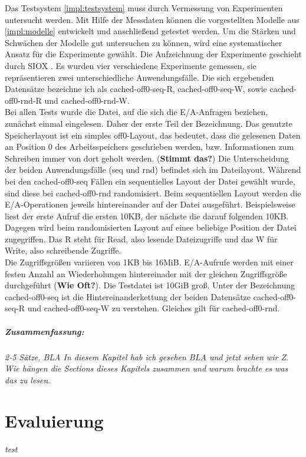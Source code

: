 \documentclass[
	12pt,
	a4paper,
	BCOR10mm,
	DIV14,
	listof=totoc,
	bibliography=totoc,
	headsepline
]{scrreprt}
\begin{document}
Das Testsystem \ref{impl:testsystem} muss durch Vermessung von Experimenten untersucht werden. Mit Hilfe der Messdaten können die vorgestellten Modelle aus \ref{impl:modelle} entwickelt und anschließend getestet werden. Um die Stärken und Schwächen der Modelle gut untersuchen zu können, wird eine systematischer Ansatz für die Experimente gewählt. Die Aufzeichnung der Experimente geschieht durch SIOX \cite{UMLTPTPONI15}. Es wurden vier verschiedene Experimente gemessen, sie repräsentieren zwei unterschiedliche Anwendungsfälle. Die sich ergebenden Datensätze bezeichne ich als cached-off0-seq-R, cached-off0-seq-W, sowie cached-off0-rnd-R und cached-off0-rnd-W.\\
Bei allen Tests wurde die Datei, auf die sich die E/A-Anfragen beziehen, zunächst einmal eingelesen. Daher der erste Teil der Bezeichnung. Das genutzte Speicherlayout ist ein simples off0-Layout, das bedeutet, dass die gelesenen Daten an Position 0 des Arbeitsspeichers geschrieben werden, bzw. Informationen zum Schreiben immer von dort geholt werden. (\textbf{Stimmt das?})
Die Unterscheidung der beiden Anwendungsfälle (seq und rnd) befindet sich im Dateilayout. Während bei den cached-off0-seq Fällen ein sequentielles Layout der Datei gewählt wurde, sind diese bei cached-off0-rnd randomisiert. Beim sequentiellen Layout werden die E/A-Operationen jeweils hintereinander auf der Datei ausgeführt. Beispielsweise liest der erste Aufruf die ersten 10KB, der nächste die darauf folgenden 10KB. Dagegen wird beim randomisierten Layout auf einee beliebige Position der Datei zugegriffen. Das R steht für Read, also lesende Dateizugriffe und das W für Write, also schreibende Zugriffe.\\
Die Zugriffsgrößen variieren von 1KB bis 16MiB. E/A-Aufrufe werden mit einer festen Anzahl an Wiederholungen hintereinader mit der gleichen Zugriffsgröße durchgeführt (\textbf{Wie Oft?}). Die Testdatei ist 10GiB groß. Unter der Bezeichnung cached-off0-seq ist die Hintereinanderkettung der beiden Datensätze cached-off0-seq-R und cached-off0-seq-W zu verstehen. Gleiches gilt für cached-off0-rnd. 


\paragraph{Zusammenfassung:}
\textit{2-5 Sätze, BLA In diesem Kapitel hab ich gesehen BLA und jetzt sehen wir Z. Wie hängen die Sections dieses Kapitels zusammen und warum brachte es was das zu lesen.}

\chapter{Evaluierung}
\textit{%
	test
}
\bigskip
\end{document}
